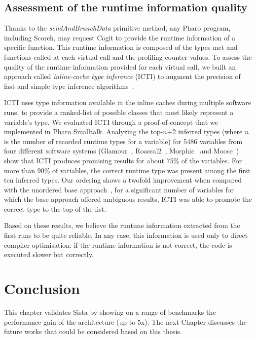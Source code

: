 \documentclass[a4paper,12pt,twoside]{../includes/ThesisStyle}
\begin{document}
\subsection{Assessment of the runtime information quality}

Thanks to the \emph{sendAndBranchData} primitive method, any Pharo program, including Scorch, may request Cogit to provide the runtime information of a specific function. This runtime information is composed of the types met and functions called at each virtual call and the profiling counter values. To assess the quality of the runtime information provided for each virtual call, we built an approach called \emph{inline-cache type inference} (ICTI) to augment the precision of fast and simple type inference algorithms~\cite{Milo16a}. 

ICTI uses type information available in the inline caches during multiple software runs, to provide a ranked-list of possible classes that most likely represent a variable's type. We evaluated ICTI through a proof-of-concept that we implemented in Pharo Smalltalk. Analyzing the top-$n$+2 inferred types (where $n$ is the number of recorded runtime types for a variable) for 5486 variables from four different software systems (Glamour~\cite{Bung09a}, Roassal2~\cite{Pena13a}, Morphic~\cite{Fern07y} and Moose~\cite{Girb10a, Duca05a, Duca00b}) show that ICTI produces promising results for about 75\% of the variables. For more than 90\% of variables, the correct runtime type was present among the first ten inferred types. Our ordering shows a twofold improvement when compared with the unordered base approach~\cite{Pluq09a}, \ie for a significant number of variables for which the base approach offered ambiguous results, ICTI was able to promote the correct type to the top of the list.

Based on these results, we believe the runtime information extracted from the first runs to be quite reliable. In any case, this information is used only to direct compiler optimisation: if the runtime information is not correct, the code is executed slower but correctly.


\section*{Conclusion}

This chapter validates Sista by showing on a range of benchmarks the performance gain of the architecture (up to 5x). The next Chapter discusses the future works that could be considered based on this thesis.

\ifx\wholebook\relax\else
    
\end{document}
